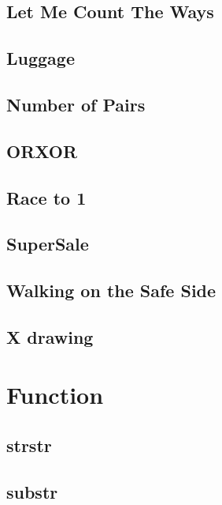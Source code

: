         \subsection{Let Me Count The Ways}
                
        \subsection{Luggage}
                
        \subsection{Number of Pairs}
                
        \subsection{ORXOR}
                
        \subsection{Race to 1}
                
        \subsection{SuperSale}
                
        \subsection{Walking on the Safe Side}
                
        \subsection{X drawing}
                

\section{Function}
        \subsection{strstr}
                
        \subsection{substr}
                
